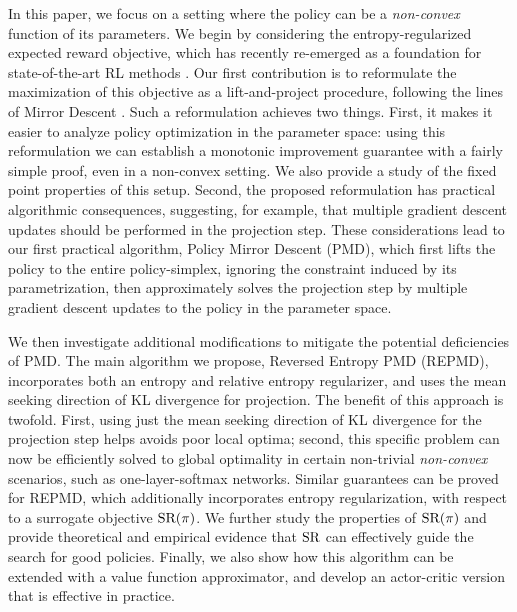 In this paper, we focus on a setting where the policy can be
a \emph{non-convex} function of its parameters.
We begin by considering the entropy-regularized expected reward objective,
which has recently re-emerged as a foundation for state-of-the-art RL methods
\citep{williams1991function,fox2015taming,schulman2017equivalence,nachum2017bridging,haarnoja2017reinforcement}. 
Our first contribution is to reformulate the maximization of 
this objective as a lift-and-project procedure,
following the lines of Mirror Descent
\citep{nemirovskii1983problem,beck2003mirror}.
Such a reformulation achieves two things.
First, %
it
makes it easier to analyze policy optimization
in the parameter space:
using this reformulation we can establish a monotonic improvement guarantee
with a fairly simple proof,
even in a non-convex setting.
We also provide a study of the fixed point properties of this setup.
Second, the proposed reformulation has practical algorithmic consequences,
suggesting, for example,
that multiple gradient descent updates should be performed
in the projection step.
These considerations lead to our first practical algorithm,
Policy Mirror Descent (PMD),
which first lifts the policy to the entire policy-simplex,
ignoring the constraint induced by its parametrization,
then approximately solves the projection step by multiple
gradient descent updates to the policy in the parameter space. 
%
%

We then investigate
additional modifications to mitigate the potential deficiencies of PMD.
The main algorithm we propose, Reversed Entropy PMD (REPMD),
incorporates both an entropy and relative entropy regularizer,
and uses the mean seeking direction of KL divergence for projection.
The benefit of this approach is twofold.
First, 
using just the mean seeking direction of KL divergence for the projection step
helps avoids poor local optima;
second,
this specific problem can now be efficiently solved to global optimality
in certain non-trivial \emph{non-convex} scenarios,
such as one-layer-softmax networks.
Similar guarantees can be proved for REPMD,
which additionally incorporates entropy regularization,
with respect to a surrogate objective $\text{SR}(\pi)$.
We further study the properties of $\text{SR}(\pi)$ and provide theoretical
and empirical evidence that $\text{SR}$ 
can effectively guide the search for good policies.
Finally, we also show how this algorithm can be extended 
with a value function approximator,
and develop an actor-critic version that is effective in practice.




